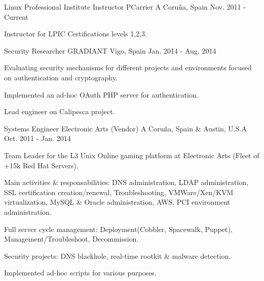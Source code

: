 

\begin{cventries}

  \cventry
    {Linux Professional Institute Instructor} %
    {PCarrier} %
    {A Coruña, Spain} %
    {Nov. 2011 - Current} %
    {
      \begin{cvitems} %
        \item {Instructor for LPIC Certifications levels 1,2,3.}
      \end{cvitems}
    }

  \cventry
    {Security Researcher} %
    {GRADIANT} %
    {Vigo, Spain} %
    {Jan. 2014 - Aug. 2014} %
    {
      \begin{cvitems} %
        \item {Evaluating security mechanisms for different projects and environments focused on authentication and cryptography.}
        \item {Implemented an ad-hoc OAuth PHP server for authentication.}
        \item {Lead engineer on Calipesca project.}
      \end{cvitems}
    }

  \cventry
    {Systems Engineer} %
    {Electronic Arts (Vendor)} %
    {A Coruña, Spain \& Austin, U.S.A} %
    {Oct. 2011 - Jan. 2014} %
    {
      \begin{cvitems} %
        \item {Team Leader for the L3 Unix Online gaming platform at Electronic Arts (Fleet of +15k Red Hat Servers).}
        \item {Main activities \& responsabilities: DNS administration, LDAP administration, SSL certification creation/renewal, Troubleshooting, VMWare/Xen/KVM virtualization, MySQL \& Oracle administration, AWS, PCI environment administration. }
	\item {Full server cycle management: Deployment(Cobbler, Spacewalk, Puppet), Management/Troubleshoot, Decommission.} 
	\item {Security projects: DNS blackhole, real-time rootkit \& malware detection.} 
	\item {Implemented ad-hoc scripts for various purposes.} 
      \end{cvitems}
    }


\end{cventries}
